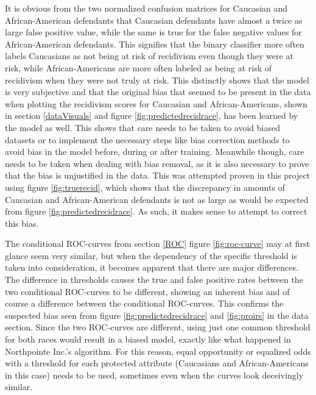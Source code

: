 \documentclass[11pt, fleqn, titlepage]{article}
\begin{document}
	It is obvious from the two normalized confusion matrices for Caucasian and African-American defendants that Caucasian defendants have almost a twice as large false positive value, while the same is true for the false negative values for African-American defendants. This signifies that the binary classifier more often labels Caucasians as not being at risk of recidivism even though they were at risk, while African-Americans are more often labeled as being at risk of recidivism when they were not truly at risk. This distinctly shows that the model is very subjective and that the original bias that seemed to be present in the data when plotting the recidivism scores for Caucasian and African-Americans, shown in section \ref{dataVisuals} and figure \ref{fig:predictedrecidrace}, has been learned by the model as well. This shows that care needs to be taken to avoid biased datasets or to implement the necessary steps like bias correction methods to avoid bias in the model before, during or after training. Meanwhile though, care needs to be taken when dealing with bias removal, as it is also necessary to prove that the bias is unjustified in the data. This was attempted proven in this project using figure \ref{fig:truerecid}, which shows that the discrepancy in amounts of Caucasian and African-American defendants is not as large as would be expected from figure \ref{fig:predictedrecidrace}. As such, it makes sense to attempt to correct this bias.
	
	The conditional ROC-curves from section \ref{ROC} figure \ref{fig:roc-curve} may at first glance seem very similar, but when the dependency of the specific threshold is taken into consideration, it becomes apparent that there are major differences. The difference in thresholds causes the true and false positive rates between the two conditional ROC-curves to be different, showing an inherent bias and of course a difference between the conditional ROC-curves. This confirms the suspected bias seen from figure \ref{fig:predictedrecidrace} and \ref{fig:proirs} in the data section. Since the two ROC-curves are different, using just one common threshold for both races would result in a biased model, exactly like what happened in Northpointe Inc.'s algorithm. For this reason, equal opportunity or equalized odds with a threshold for each protected attribute (Caucasians and African-Americans in this case) needs to be used, sometimes even when the curves look deceivingly similar.
	
\end{document}
